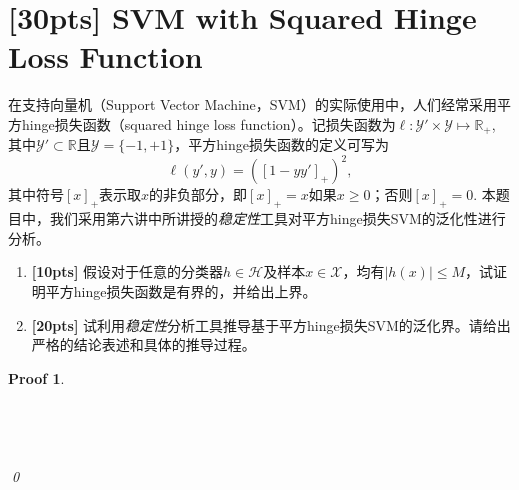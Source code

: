 \documentclass[a4paper,UTF8]{article}
\numberwithin{equation}{section}
\newtheorem*{myProof}{Proof}
\begin{document}
	\section{[30pts] SVM with Squared Hinge Loss Function}
	在支持向量机（Support Vector Machine，SVM）的实际使用中，人们经常采用平方hinge损失函数（squared hinge loss function）。记损失函数为$\ell: \mathcal{Y}'\times \mathcal{Y} \mapsto \mathbb{R}_+$, 其中$\mathcal{Y}' \subset \mathbb{R}$且$\mathcal{Y} = \{-1,+1\}$，平方hinge损失函数的定义可写为
	\begin{equation}
	\label{eq:squared-hinge-loss}
	\ell(y',y) = ([1-yy']_+)^2,
	\end{equation}
	其中符号$[x]_+$表示取$x$的非负部分，即$[x]_+ = x$如果$x\geq 0$；否则$[x]_+ = 0$. 本题目中，我们采用第六讲中所讲授的\emph{稳定性}工具对平方hinge损失SVM的泛化性进行分析。
	
	\begin{enumerate}[ {(}1{)}]
		\item \textbf{[10pts]} 假设对于任意的分类器$h\in \mathcal{H}$及样本$x\in \mathcal{X}$，均有$\lvert h(x) \rvert \leq M$，试证明平方hinge损失函数是有界的，并给出上界。
		\item \textbf{[20pts]} 试利用\emph{稳定性}分析工具推导基于平方hinge损失SVM的泛化界。请给出严格的结论表述和具体的推导过程。
	\end{enumerate}
	
	\begin{myProof}~\\
	~\\
	~\\
	~\\
	~\\
	\qed
	\end{myProof}
	
\end{document}
